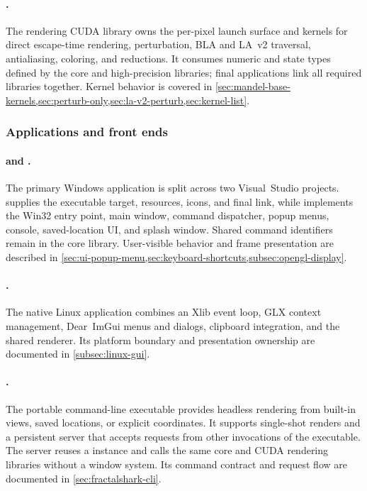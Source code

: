 \paragraph{.}
The rendering CUDA library owns the per-pixel launch surface and kernels for
direct escape-time rendering, perturbation, BLA and LA~v2 traversal,
antialiasing, coloring, and reductions.  It consumes numeric and state types
defined by the core and high-precision libraries; final applications link all
required libraries together.  Kernel behavior is covered in
\cref{sec:mandel-base-kernels,sec:perturb-only,sec:la-v2-perturb,sec:kernel-list}.

\subsubsection{Applications and front ends}

\paragraph{ and .}
The primary Windows application is split across two Visual~Studio projects.
 supplies the executable target, resources, icons, and final
link, while  implements the Win32 entry point, main
window, command dispatcher, popup menus, console, saved-location UI, and splash
window.  Shared command identifiers remain in the core library.  User-visible
behavior and frame presentation are described in
\cref{sec:ui-popup-menu,sec:keyboard-shortcuts,subsec:opengl-display}.

\paragraph{.}
The native Linux application combines an Xlib event loop, GLX context
management, Dear~ImGui menus and dialogs, clipboard integration, and the shared renderer.
Its platform boundary and presentation ownership are documented in
\cref{subsec:linux-gui}.

\paragraph{.}
The portable command-line executable provides headless rendering from built-in
views, saved locations, or explicit coordinates. It supports single-shot
renders and a persistent server that accepts requests from other invocations
of the executable. The server reuses a  instance and calls the
same core and CUDA rendering libraries without a window system. Its command
contract and request flow are documented in \cref{sec:fractalshark-cli}.

